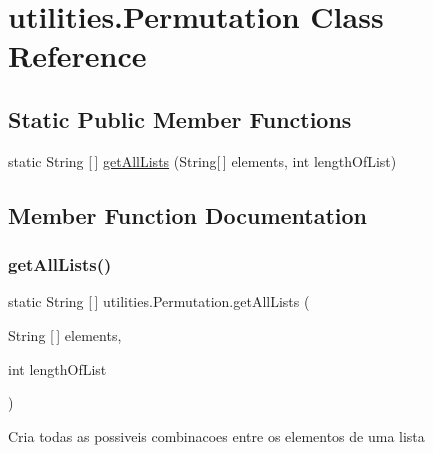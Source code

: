 \hypertarget{classutilities_1_1_permutation}{}\section{utilities.\+Permutation Class Reference}
\label{classutilities_1_1_permutation}
\subsection*{Static Public Member Functions}
\begin{DoxyCompactItemize}
\item 
static String \mbox{[}$\,$\mbox{]} \hyperlink{classutilities_1_1_permutation_a99314b491e989a85b57855baeb499b70}{get\+All\+Lists} (String\mbox{[}$\,$\mbox{]} elements, int length\+Of\+List)
\end{DoxyCompactItemize}


\subsection{Member Function Documentation}
\mbox{\label{classutilities_1_1_permutation_a99314b491e989a85b57855baeb499b70}} 
\subsubsection{\texorpdfstring{get\+All\+Lists()}{getAllLists()}}
{\footnotesize\ttfamily static String \mbox{[}$\,$\mbox{]} utilities.\+Permutation.\+get\+All\+Lists (\begin{DoxyParamCaption}\item[{String \mbox{[}$\,$\mbox{]}}]{elements,  }\item[{int}]{length\+Of\+List }\end{DoxyParamCaption})\hspace{0.3cm}{\ttfamily [static]}}

Cria todas as possiveis combinacoes entre os elementos de uma lista


